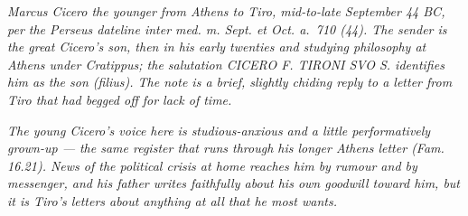 
\textit{Marcus Cicero the younger from Athens to Tiro, mid-to-late
September 44 BC, per the Perseus dateline \textit{inter med. m.
Sept. et Oct. a.~710 (44)}. The sender is the great Cicero's son,
then in his early twenties and studying philosophy at Athens
under Cratippus; the salutation \textit{CICERO F. TIRONI SVO S.}
identifies him as the son (\textit{filius}). The note is a brief,
slightly chiding reply to a letter from Tiro that had begged off
for lack of time.}

\textit{The young Cicero's voice here is studious-anxious and a
little performatively grown-up --- the same register that runs
through his longer Athens letter (\textit{Fam.} 16.21). News of
the political crisis at home reaches him by rumour and by
messenger, and his father writes faithfully about \textit{his own
goodwill toward him}, but it is Tiro's letters about anything at
all that he most wants.}
